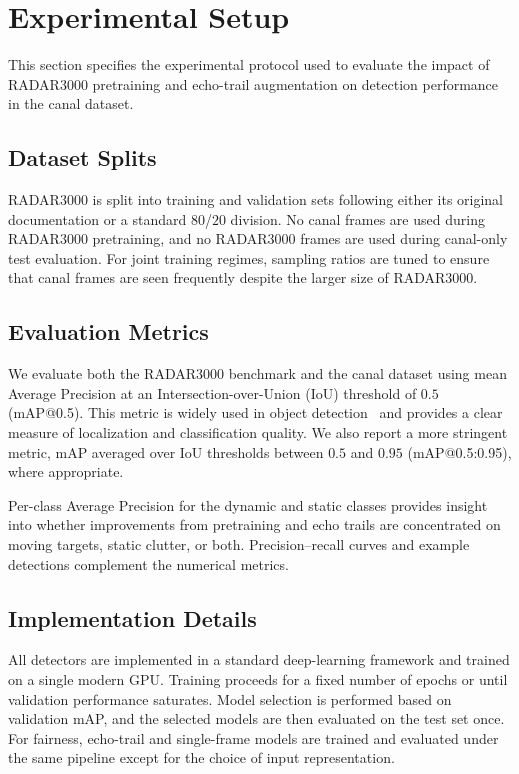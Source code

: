 \documentclass[twocolumn, 10pt]{article}
\begin{document}
\section{Experimental Setup}
\label{sec:setup}
This section specifies the experimental protocol used to evaluate the impact of RADAR3000 pretraining and echo-trail augmentation on detection performance in the canal dataset.

\subsection{Dataset Splits}
RADAR3000 is split into training and validation sets following either its original documentation or a standard $80$/$20$ division. No canal frames are used during RADAR3000 pretraining, and no RADAR3000 frames are used during canal-only test evaluation. For joint training regimes, sampling ratios are tuned to ensure that canal frames are seen frequently despite the larger size of RADAR3000.

\subsection{Evaluation Metrics}
We evaluate both the RADAR3000 benchmark and the canal dataset using mean Average Precision at an Intersection-over-Union (IoU) threshold of $0.5$ (mAP@0.5). This metric is widely used in object detection~\cite{lin2014coco, everingham2010pascal_voc} and provides a clear measure of localization and classification quality. We also report a more stringent metric, mAP averaged over IoU thresholds between $0.5$ and $0.95$ (mAP@0.5:0.95), where appropriate.

Per-class Average Precision for the dynamic and static classes provides insight into whether improvements from pretraining and echo trails are concentrated on moving targets, static clutter, or both. Precision--recall curves and example detections complement the numerical metrics.

\subsection{Implementation Details}
All detectors are implemented in a standard deep-learning framework and trained on a single modern GPU. Training proceeds for a fixed number of epochs or until validation performance saturates. Model selection is performed based on validation mAP, and the selected models are then evaluated on the test set once. For fairness, echo-trail and single-frame models are trained and evaluated under the same pipeline except for the choice of input representation.
\end{document}

